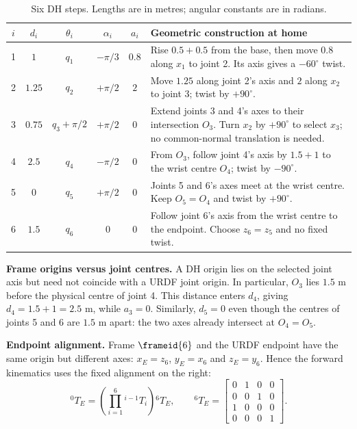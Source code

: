 \begin{table}[h!]
\centering
\caption{Six DH steps. Lengths are in metres; angular constants are in radians.}
\label{tab:dh}
\small
\setlength{\tabcolsep}{5pt}
\renewcommand{\arraystretch}{1.35}
\begin{tabularx}{\linewidth}{@{}c c c c c X@{}}
\toprule
$i$ & $d_i$ & $\theta_i$ & $\alpha_i$ & $a_i$ & Geometric construction at home \\
\midrule
1 & $1$ & $q_1$ & $-\pi/3$ & $0.8$
  & Rise $0.5+0.5$ from the base, then move $0.8$ along $x_1$ to joint 2.
    Its axis gives a $-60^\circ$ twist. \\
2 & $1.25$ & $q_2$ & $+\pi/2$ & $2$
  & Move $1.25$ along joint 2's axis and $2$ along $x_2$ to joint 3;
    twist by $+90^\circ$. \\
3 & $0.75$ & $q_3+\pi/2$ & $+\pi/2$ & $0$
  & Extend joints 3 and 4's axes to their intersection $O_3$.
    Turn $x_2$ by $+90^\circ$ to select $x_3$; no common-normal translation is needed. \\
4 & $2.5$ & $q_4$ & $-\pi/2$ & $0$
  & From $O_3$, follow joint 4's axis by $1.5+1$ to the wrist centre $O_4$;
    twist by $-90^\circ$. \\
5 & $0$ & $q_5$ & $+\pi/2$ & $0$
  & Joints 5 and 6's axes meet at the wrist centre.
    Keep $O_5=O_4$ and twist by $+90^\circ$. \\
6 & $1.5$ & $q_6$ & $0$ & $0$
  & Follow joint 6's axis from the wrist centre to the endpoint.
    Choose $z_6=z_5$ and no fixed twist. \\
\bottomrule
\end{tabularx}
\end{table}

\textbf{Frame origins versus joint centres.}
A DH origin lies on the selected joint axis but need not coincide with a URDF
joint origin. In particular, $O_3$ lies $1.5$ m before the
physical centre of joint 4. This distance enters $d_4$, giving $d_4=1.5+1=2.5$ m,
while $a_3=0$. Similarly, $d_5=0$ even though the centres of joints 5 and 6 are
$1.5$ m apart: the two axes already intersect at $O_4=O_5$.

\textbf{Endpoint alignment.}
Frame $\frameid{6}$ and the URDF endpoint have the same origin but different axes:
$x_E=z_6$, $y_E=x_6$ and $z_E=y_6$. Hence the forward kinematics uses the fixed
alignment on the right:
\begin{equation}
 {}^0T_E=\left(\prod_{i=1}^{6}{}^{i-1}\!T_i\right){}^6T_E,
 \qquad
 {}^6T_E=\begin{bmatrix}
 0&1&0&0\\0&0&1&0\\1&0&0&0\\0&0&0&1
 \end{bmatrix}.
 \label{eq:dh-tool}
\end{equation}
